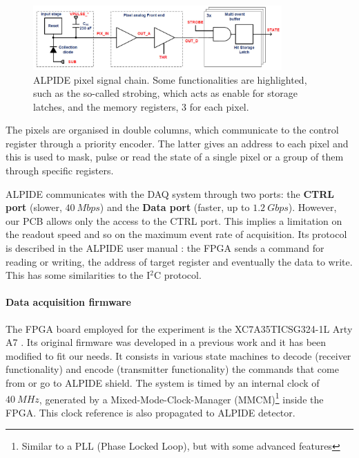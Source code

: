 \documentclass[../../main/main.tex]{subfiles}
\begin{document}
\begin{figure}[h]
    \centering
    \includegraphics[width=0.85\textwidth]{../sections/02/images/alpide/Block_diagram.jpg}
    \caption{ALPIDE pixel signal chain. Some functionalities are highlighted, such as the so-called strobing, which acts as enable for storage latches, and the memory registers, 3 for each pixel.}
    \label{fig:detection_alpide_pixel_chain}
\end{figure}


The pixels are organised in double columns, which communicate to the control register through a priority encoder. The latter gives an address to each pixel and this is used to mask, pulse or read the state of a single pixel or a group of them through specific registers.

ALPIDE communicates with the DAQ system through two ports: the \textbf{CTRL port} (slower, \( 40 \ \si{Mbps} \)) and the \textbf{Data port} (faster, up to \( 1.2 \ \si{Gbps} \)). However, our PCB allows only the access to the CTRL port. This implies a limitation on the readout speed and so on the maximum event rate of acquisition.
Its protocol is described in the ALPIDE user manual \cite{Manual_ALP}: the FPGA sends a command for reading or writing, the address of target register and eventually the data to write. This has some similarities to the I$^2$C protocol.


\paragraph{Data acquisition firmware}
The FPGA board employed for the experiment is the XC7A35TICSG324-1L Arty A7 \cite{Arty_A7}. Its original firmware was developed in a previous work \cite{tesi_gabri} and it has been modified to fit our needs.
It consists in various state machines to decode (receiver functionality) and encode (transmitter functionality) the commands that come from or go to ALPIDE shield.
The system is timed by an internal clock of \( 40 \ \si{MHz} \), generated by a Mixed-Mode-Clock-Manager (MMCM)\footnote{Similar to a PLL (Phase Locked Loop), but with some advanced features} inside the FPGA. This clock reference is also propagated to ALPIDE detector.
\end{document}
